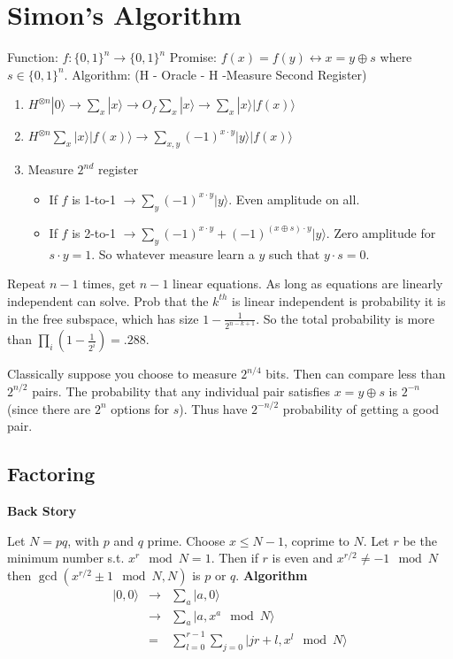 \documentclass[12pt]{article}
\begin{document}
\section{Simon's Algorithm}


Function: $f:\{0,1\}^n\rightarrow\{0,1\}^n$ \newline
Promise: $f(x)=f(y)\leftrightarrow x=y\oplus s$ where $s\in\{0,1\}^n$. \newline
Algorithm: (H - Oracle - H -Measure Second Register)
\begin{enumerate}
\item$ H^{\otimes n}|0\rangle \rightarrow \sum_x|x\rangle\rightarrow O_f\sum_x|x\rangle\rightarrow \sum_x|x\rangle|f(x)\rangle$
\item $ H^{\otimes n}\sum_x|x\rangle|f(x)\rangle\rightarrow\sum_{x,y}(-1)^{x\cdot y}|y\rangle|f(x)\rangle$
\item Measure $2^{nd}$ register\begin{itemize}
\item If $f$ is 1-to-1 $\rightarrow \sum_y(-1)^{x\cdot y}|y\rangle$. Even amplitude on all.
\item If $f$ is 2-to-1 $\rightarrow \sum_y(-1)^{x\cdot y}+(-1)^{(x\oplus s)\cdot y}|y\rangle$. Zero amplitude for $s\cdot y=1$. So whatever measure learn a $y$ such that $y\cdot s=0$.
\end{itemize}
\end{enumerate}
Repeat $n-1$ times, get $n-1$ linear equations. As long as equations are linearly independent can solve. Prob that the $k^{th}$ is linear independent is probability it is in the free subspace, which has size $1-\frac{1}{2^{n-k+1}}$. So the total probability is more than $\prod_i(1-\frac{1}{2^i})=.288$. 

Classically suppose you choose to measure $2^{n/4}$ bits. Then can compare less than $2^{n/2}$ pairs. The probability that any individual pair satisfies $x=y\oplus s$ is $2^{-n}$ (since there are $2^n$ options for $s$). Thus have $2^{-n/2}$ probability of getting a good pair.

\subsection{Factoring}
{\bf Back Story}

\noindent Let $N=pq$, with $p$ and $q$ prime. Choose $x\leq N-1$, coprime to $N$. 
Let $r$ be the minimum number s.t. $x^r\mod{N}=1$.
Then if $r$ is even and $x^{r/2}\neq -1\mod{N}$ then $\gcd(x^{r/2}\pm1\mod{N}, N)$ is $p$ or $q$.
\newline
{\bf Algorithm}
\begin{eqnarray}
|0,0\rangle&\rightarrow&\sum_a|a,0\rangle\\
&\rightarrow&\sum_a|a,x^a\mod{N}\rangle\\
&=&\sum_{l=0}^{r-1}\sum_{j=0}|jr+l,x^l \mod N\rangle
\end{eqnarray}
\end{document}
